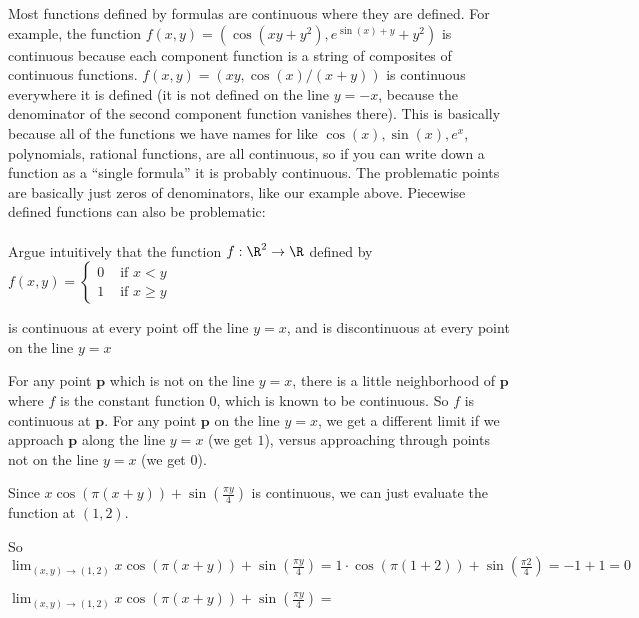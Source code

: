 \documentclass{ximera}
\begin{document}
	Most functions defined by formulas are continuous where they are defined.  For example, the function
	$f(x,y) = (\cos(xy+y^2),e^{\sin(x)+y}+y^2)$ is continuous because each component function is a string of composites of continuous functions. 
	$f(x,y) = (xy,\cos(x)/(x+y))$ is continuous everywhere it is defined (it is not defined on the line $y=-x$, because the denominator of the 
	second component function vanishes there).  This is basically because all of the functions we have names for like $\cos(x),\sin(x), e^x$, polynomials, 
	rational functions, are all continuous, so if you can write down a function as a ``single formula'' it is probably continuous. 
	The problematic points are basically just zeros of denominators, like our example above.  Piecewise defined functions can also be problematic:
	\\
	\\
		Argue intuitively that the function $f:\R^2 \to \R$ defined by 
			\(f(x,y) = \begin{cases}
			0 & \text{ if $x<y$}\\
			1 & \text{ if $x\geq y$}
			\end{cases}\)
			
			is continuous at every point off the line $y=x$, and is discontinuous at every point on the line $y=x$
\begin{free-response}
	For any point $\mathbf{p}$ which is not on the line $y=x$, there is a little neighborhood of $\mathbf{p}$ where $f$ is the constant function $0$,
	 which is known to be  continuous.  So $f$ is continuous at $\mathbf{p}$.  For any point $\mathbf{p}$ on the line $y=x$, we get a different limit if we approach 
	 $\mathbf{p}$ along the line $y=x$ (we get $1$), versus approaching through points not on the line $y=x$ (we get $0$).
\end{free-response}
	
	\begin{question}
		\begin{solution}
		\begin{hint}
			Since $x\cos(\pi (x+y)) + \sin(\frac{\pi y}{4})$ is continuous, we can just evaluate the function at $(1,2)$.
		\end{hint}
		\begin{hint}
			So $\displaystyle\lim_{(x,y) \to (1,2)} x\cos(\pi (x+y)) + \sin(\frac{\pi y}{4}) = 1 \cdot \cos(\pi(1+2))+\sin(\frac{\pi 2}{4}) = -1+1=0$
		\end{hint}
		$\lim_{(x,y) \to (1,2)} x\cos(\pi (x+y)) + \sin(\frac{\pi y}{4}) =$ 
		\end{solution}
	\end{question}
	
\end{document}
